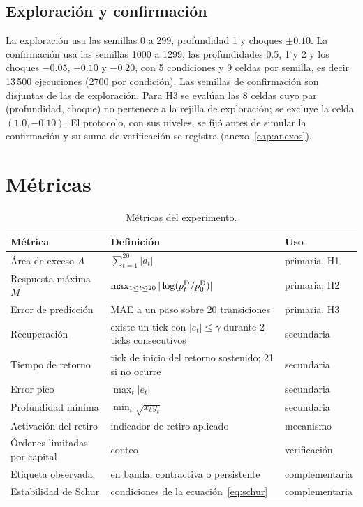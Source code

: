 \subsection{Exploración y confirmación}

La exploración usa las semillas 0 a 299, profundidad 1 y choques $\pm0.10$. La confirmación usa las semillas 1000 a 1299, las profundidades 0.5, 1 y 2 y los choques $-0.05$, $-0.10$ y $-0.20$, con 5 condiciones y 9 celdas por semilla, es decir 13\,500 ejecuciones (2700 por condición). Las semillas de confirmación son disjuntas de las de exploración. Para H3 se evalúan las 8 celdas cuyo par (profundidad, choque) no pertenece a la rejilla de exploración; se excluye la celda $(1.0,-0.10)$. El protocolo, con sus niveles, se fijó antes de simular la confirmación y su suma de verificación se registra (anexo~\ref{cap:anexos}).

\section{Métricas}

\begin{table}[htbp]
\centering
\caption{Métricas del experimento.}
\label{tab:metricas}
\small
\begin{tabularx}{\textwidth}{@{}l >{\raggedright\arraybackslash}X l@{}}
\toprule
Métrica & Definición & Uso \\
\midrule
Área de exceso $A$ & $\sum_{t=1}^{20}|d_t|$ & primaria, H1 \\
Respuesta máxima $M$ & $\max_{1\le t\le 20}|\log(p^{\mathrm{D}}_t/p^{\mathrm{D}}_0)|$ & primaria, H2 \\
Error de predicción & MAE a un paso sobre 20 transiciones & primaria, H3 \\
Recuperación & existe un tick con $|e_t|\le\gamma$ durante 2 ticks consecutivos & secundaria \\
Tiempo de retorno & tick de inicio del retorno sostenido; 21 si no ocurre & secundaria \\
Error pico & $\max_t|e_t|$ & secundaria \\
Profundidad mínima & $\min_t\sqrt{x_ty_t}$ & secundaria \\
Activación del retiro & indicador de retiro aplicado & mecanismo \\
Órdenes limitadas por capital & conteo & verificación \\
Etiqueta observada & en banda, contractiva o persistente & complementaria \\
Estabilidad de Schur & condiciones de la ecuación~\eqref{eq:schur} & complementaria \\
\bottomrule
\end{tabularx}
\end{table}

